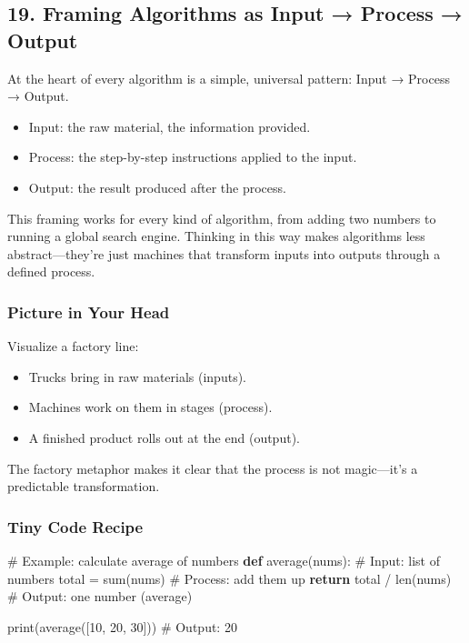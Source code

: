 \documentclass[
  letterpaper,
  DIV=11,
  numbers=noendperiod]{scrreprt}
\newenvironment{Shaded}{\begin{snugshade}}{\end{snugshade}}
\newcommand{\BuiltInTok}[1]{\textcolor[rgb]{0.00,0.23,0.31}{#1}}
\newcommand{\CommentTok}[1]{\textcolor[rgb]{0.37,0.37,0.37}{#1}}
\newcommand{\ControlFlowTok}[1]{\textcolor[rgb]{0.00,0.23,0.31}{\textbf{#1}}}
\newcommand{\DecValTok}[1]{\textcolor[rgb]{0.68,0.00,0.00}{#1}}
\newcommand{\KeywordTok}[1]{\textcolor[rgb]{0.00,0.23,0.31}{\textbf{#1}}}
\newcommand{\NormalTok}[1]{\textcolor[rgb]{0.00,0.23,0.31}{#1}}
\newcommand{\OperatorTok}[1]{\textcolor[rgb]{0.37,0.37,0.37}{#1}}
\providecommand{\tightlist}{%
  \setlength{\itemsep}{0pt}\setlength{\parskip}{0pt}}
\begin{document}
\subsection{19. Framing Algorithms as Input → Process →
Output}\label{framing-algorithms-as-input-process-output}

At the heart of every algorithm is a simple, universal pattern: Input →
Process → Output.

\begin{itemize}
\tightlist
\item
  Input: the raw material, the information provided.
\item
  Process: the step-by-step instructions applied to the input.
\item
  Output: the result produced after the process.
\end{itemize}

This framing works for every kind of algorithm, from adding two numbers
to running a global search engine. Thinking in this way makes algorithms
less abstract---they're just machines that transform inputs into outputs
through a defined process.

\subsubsection{Picture in Your Head}\label{picture-in-your-head-18}

Visualize a factory line:

\begin{itemize}
\tightlist
\item
  Trucks bring in raw materials (inputs).
\item
  Machines work on them in stages (process).
\item
  A finished product rolls out at the end (output).
\end{itemize}

The factory metaphor makes it clear that the process is not magic---it's
a predictable transformation.

\subsubsection{Tiny Code Recipe}\label{tiny-code-recipe-17}

\begin{Shaded}
\begin{Highlighting}[]
\CommentTok{\# Example: calculate average of numbers}
\KeywordTok{def}\NormalTok{ average(nums):           }\CommentTok{\# Input: list of numbers}
\NormalTok{    total }\OperatorTok{=} \BuiltInTok{sum}\NormalTok{(nums)        }\CommentTok{\# Process: add them up}
    \ControlFlowTok{return}\NormalTok{ total }\OperatorTok{/} \BuiltInTok{len}\NormalTok{(nums) }\CommentTok{\# Output: one number (average)}

\BuiltInTok{print}\NormalTok{(average([}\DecValTok{10}\NormalTok{, }\DecValTok{20}\NormalTok{, }\DecValTok{30}\NormalTok{])) }\CommentTok{\# Output: 20}
\end{Highlighting}
\end{Shaded}
\end{document}
